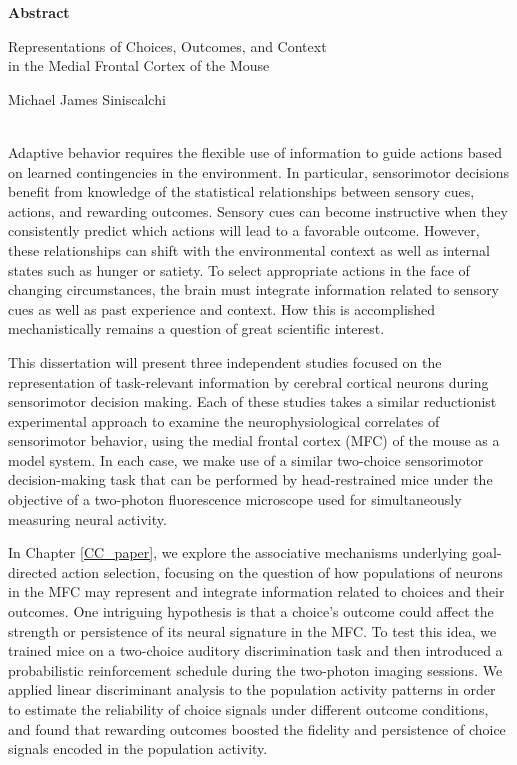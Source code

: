 \begin{center}
\begin{singlespace}

\textbf{Abstract}
\bigskip

Representations of Choices, Outcomes, and Context\\
in the Medial Frontal Cortex of the Mouse\\
\bigskip

Michael James Siniscalchi\\
\\
\bigskip

\end{singlespace}
\end{center}

Adaptive behavior requires the flexible use of information to guide actions based on learned contingencies in the environment. In particular, sensorimotor decisions benefit from knowledge of the statistical relationships between sensory cues, actions, and rewarding outcomes. Sensory cues can become instructive when they consistently predict which actions will lead to a favorable outcome. However, these relationships can shift with the environmental context as well as internal states such as hunger or satiety. To select appropriate actions in the face of changing circumstances, the brain must integrate information related to sensory cues as well as past experience and context. How this is accomplished mechanistically remains a question of great scientific interest.

This dissertation will present three independent studies focused on the representation of task-relevant information by cerebral cortical neurons during sensorimotor decision making. Each of these studies takes a similar reductionist experimental approach to examine the neurophysiological correlates of sensorimotor behavior, using the medial frontal cortex (MFC) of the mouse as a model system. In each case, we make use of a similar two-choice sensorimotor decision-making task that can be performed by head-restrained mice under the objective of a two-photon fluorescence microscope used for simultaneously measuring neural activity.

In Chapter \ref{CC_paper}, we explore the associative mechanisms underlying goal-directed action selection, focusing on the question of how populations of neurons in the MFC may represent and integrate information related to choices and their outcomes. One intriguing hypothesis is that a choice’s outcome could affect the strength or persistence of its neural signature in the MFC. To test this idea, we trained mice on a two-choice auditory discrimination task and then introduced a probabilistic reinforcement schedule during the two-photon imaging sessions. We applied linear discriminant analysis to the population activity patterns in order to estimate the reliability of choice signals under different outcome conditions, and found that rewarding outcomes boosted the fidelity and persistence of choice signals encoded in the population activity. 

